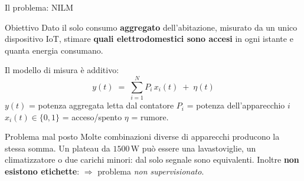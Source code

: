 \documentclass[aspectratio=169]{beamer}
\newcommand{\unit}[1]{\,\mathrm{#1}}
\begin{document}
\begin{frame}{Il problema: NILM}
  \begin{block}{Obiettivo}
    Dato il solo consumo \textbf{aggregato} dell'abitazione, misurato da un unico dispositivo IoT,
    stimare \textbf{quali elettrodomestici sono accesi} in ogni istante e quanta energia consumano.
  \end{block}

  \vspace{0.4em}
  Il modello di misura \`e additivo:
  \[
    y(t) \;=\; \sum_{i=1}^{N} P_i \, x_i(t) \;+\; \eta(t)
  \]
  \small
  $y(t)$ = potenza aggregata letta dal contatore \quad
  $P_i$ = potenza dell'apparecchio $i$ \quad
  $x_i(t)\in\{0,1\}$ = acceso/spento \quad $\eta$ = rumore.

  \vspace{0.6em}
  \begin{alertblock}{Problema mal posto}
    Molte combinazioni diverse di apparecchi producono la stessa somma. Un plateau da
    $1500\unit{W}$ pu\`o essere una lavastoviglie, un climatizzatore o due carichi minori:
    dal solo segnale sono equivalenti. Inoltre \textbf{non esistono etichette}: $\Rightarrow$ problema \emph{non supervisionato}.
  \end{alertblock}
\end{frame}
\end{document}
